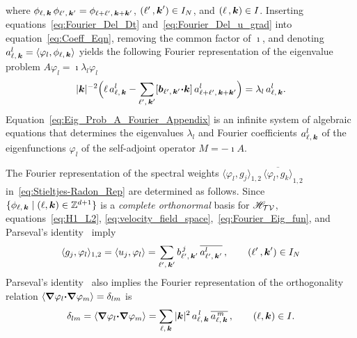 \documentclass[amsa]{ipart}
\begin{document}
%
where $\phi_{\ell,\,\boldsymbol{k}}\,\phi_{\ell^\prime,\,\boldsymbol{k}^\prime}=\phi_{\ell+\ell^\prime,\,\boldsymbol{k}+\boldsymbol{k}^\prime}$,
$(\ell^\prime\,,\boldsymbol{k}^\prime)\in I_N$, and $(\ell\,,\boldsymbol{k})\in I$. Inserting
equations~\eqref{eq:Fourier_Del_Dt} and~\eqref{eq:Fourier_Del_u_grad}
into equation~\eqref{eq:Coeff_Eqn}, removing the common factor of $\imath$,
and denoting $a^l_{\ell,\,\boldsymbol{k}}=\langle\varphi_l,\phi_{\ell,\,\boldsymbol{k}}\rangle$ yields the
following Fourier representation of the eigenvalue problem $A\varphi_l=\imath\lambda_l\varphi_l$
%
\begin{align}\label{eq:Eig_Prob_A_Fourier_Appendix}  
  |\veck|^{-2}\Big(
  \ell\,a^l_{\ell,\,\veck}
  - \sum_{\ell^\prime,\,\veck^\prime}   
  [\vecb_{\ell^\prime,\,\veck^\prime}\bcdot\veck]\, a^l_{\ell+\ell^\prime,\,\veck+\veck^\prime}
  \Big)
  =\lambda_l\,a^l_{\ell,\,\veck}.  
\end{align}
%
Equation~\eqref{eq:Eig_Prob_A_Fourier_Appendix} is an infinite system
of algebraic equations that determines the eigenvalues $\lambda_l$ and
Fourier coefficients $a^l_{\ell,\,\boldsymbol{k}}$ of the eigenfunctions $\varphi_l$ of the
self-adjoint operator $M=-\imath A$. 



The Fourier representation of the spectral weights
$\langle\varphi_l,g_j\rangle_{1,2}\,\overline{\langle\varphi_l,g_k\rangle}_{1,2}$
in~\eqref{eq:Stieltjes-Radon_Rep} are determined as follows.
Since $\{\phi_{\ell,\,\boldsymbol{k}}\;|\; (\ell,\boldsymbol{k})\in\mathbb{Z}^{d+1}\}$ is a
\emph{complete orthonormal} basis for $\mathscr{H}_{\mathcal{T}\mathcal{V}}$, 
equations~\eqref{eq:H1_L2},
\eqref{eq:velocity_field_space},~\eqref{eq:Fourier_Eig_fun}, and
Parseval's identity~\cite{PapaRudin:87} imply  
%
\begin{align}\label{eq:Inner_Products}
  \langle g_j,\varphi_l\rangle_{1,2}=\langle u_j,\varphi_l\rangle=\sum_{\ell^\prime,\,\veck^\prime}
   b^{\,j}_{\ell^\prime,\,\veck^\prime}\,\overline{a^l_{\ell^\prime,\,\veck^\prime}}\,,
   \qquad
   (\ell^\prime\,,\veck^\prime)\in I_N
\end{align}
%
Parseval's identity~\cite{PapaRudin:87} also implies the Fourier
representation of the orthogonality relation 
$\langle\mbox{\boldmath${\nabla}$}\varphi_l\mbox{\boldmath${\cdot}$}\mbox{\boldmath${\nabla}$} \varphi_m\rangle=\delta_{lm}$ is 
%
\begin{align}\label{eq:Ortho_Clmn}
  \delta_{lm}=\langle\bnabla \varphi_l\bcdot\bnabla \varphi_m\rangle
      =
      \sum_{\ell,\,\veck}|\veck|^2\,a^{\,l}_{\ell,\,\veck}\,\overline{a^{\,m}_{\ell,\,\veck}}\,,
   \qquad
   (\ell,\veck)\in I.
\end{align}
%
\end{document}
